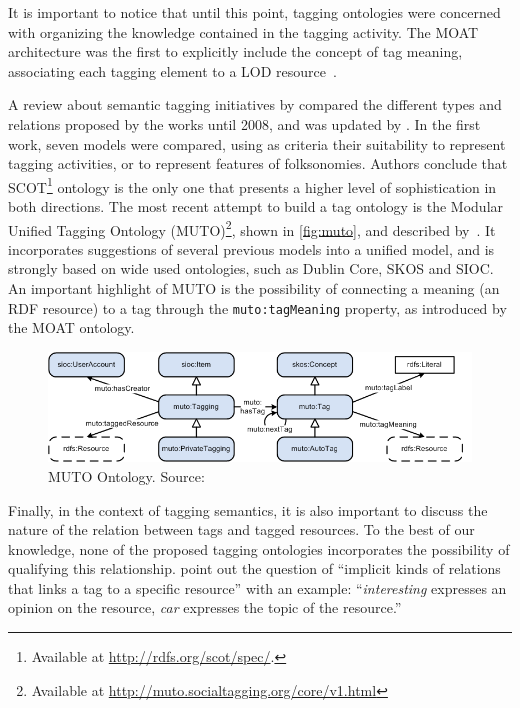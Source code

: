 It is important to notice that until this point, tagging ontologies were concerned with organizing the knowledge contained in the tagging activity.
The MOAT architecture was the first to explicitly include the concept of tag meaning, associating each tagging element to a LOD resource~\cite{Passant2008}.

A review about semantic tagging initiatives by  compared the different types and relations proposed by the works until 2008, and was updated by .
In the first work, seven models were compared, using as criteria their suitability to represent tagging activities, or to represent features of folksonomies.
Authors conclude that SCOT\footnote{Available at \url{http://rdfs.org/scot/spec/}.} ontology is the only one that presents a higher level of sophistication in both directions.
The most recent attempt to build a tag ontology is the Modular Unified Tagging Ontology (MUTO)\footnote{Available at \url{http://muto.socialtagging.org/core/v1.html}}, shown in \autoref{fig:muto}, and described by~.
It incorporates suggestions of several previous models into a unified model, and is strongly based on wide used ontologies, such as Dublin Core, SKOS and SIOC.
An important highlight of MUTO is the possibility of connecting a meaning (an RDF resource) to a tag through the \texttt{muto:tagMeaning} property, as introduced by the MOAT ontology.

\begin{figure}[t]
\begin{center}
\includegraphics[width=\columnwidth]{images/muto.png}
\caption[MUTO Ontology.]{MUTO Ontology. Source: }
\label{fig:muto}
\end{center}
\end{figure}

Finally, in the context of tagging semantics, it is also important to discuss the nature of the relation between tags and tagged resources.
To the best of our knowledge, none of the proposed tagging ontologies incorporates the possibility of qualifying this relationship.
 point out the question of ``implicit kinds of relations that links a tag to a specific resource'' with an example: ``\emph{interesting} expresses an opinion on the resource, \emph{car} expresses the topic of the resource.''

